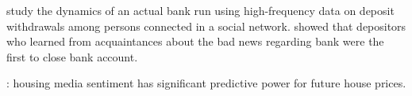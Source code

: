 \href{https://www.aeaweb.org/articles?id=10.1257/aer.102.4.1414}{\cite{iyer2012understanding}} study the dynamics of an actual bank run using high-frequency data on deposit withdrawals among persons connected in a social network.   \href{https://www.aeaweb.org/articles?id=10.1257/aer.90.5.1110}{\cite{kelly2000market}} showed that depositors who learned from acquaintances about the bad news regarding bank were the first to close bank account.


 \href{https://www.stern.nyu.edu/sites/default/files/assets/documents/con_040497.pdf}{\cite{soo_quantifying_2015}}:  housing media sentiment has significant predictive power for future house prices.

